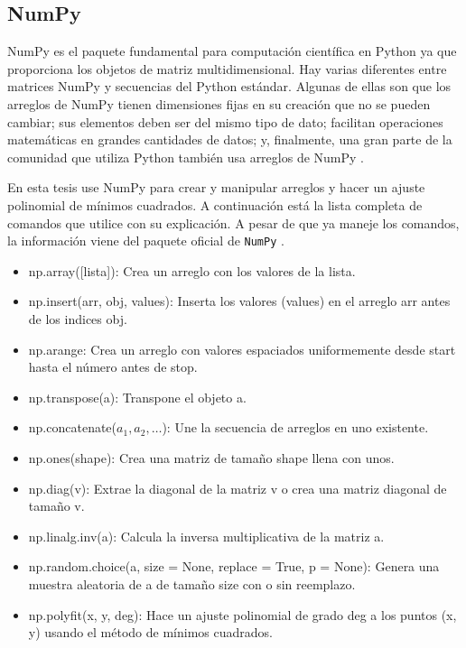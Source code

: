\subsection{NumPy}
NumPy es el paquete fundamental para computación científica en Python ya que proporciona los objetos de matriz multidimensional.
Hay varias diferentes entre matrices NumPy y secuencias del Python estándar. Algunas de ellas son que los arreglos de NumPy tienen dimensiones fijas en su creación que no se pueden cambiar; sus elementos deben ser del mismo tipo de dato; facilitan operaciones matemáticas en grandes cantidades de datos; y, finalmente, una gran parte de la comunidad que utiliza Python también usa arreglos de NumPy \citep{numpy_manual}. 

En esta tesis use NumPy para crear y manipular arreglos y hacer un ajuste polinomial de mínimos cuadrados. A continuación está la lista completa de comandos que utilice con su explicación. A pesar de que ya maneje los comandos, la información viene del paquete oficial de \texttt{NumPy} \cite{numpy_manual}. 

\begin{itemize}
	\item np.array([lista]): Crea un arreglo con los valores de la lista.
	
	\item np.insert(arr, obj, values): Inserta los valores (values) en el arreglo arr antes de los indices obj.
	
	\item np.arange: Crea un arreglo con valores espaciados uniformemente desde start hasta el número antes de stop. 
	
	\item np.transpose(a): Transpone el objeto a.
	
	\item np.concatenate($a_1, a_2, \dots $): Une la secuencia de arreglos en uno existente.
	
	\item np.ones(shape): Crea una matriz de tamaño shape llena con unos.
	
	\item np.diag(v): Extrae la diagonal de la matriz v o crea una matriz diagonal de tamaño v.
	
	\item np.linalg.inv(a): Calcula la inversa multiplicativa de la matriz a. 
	
	\item np.random.choice(a, size = None, replace = True, p = None): Genera una muestra aleatoria de a de tamaño size con o sin reemplazo. 
	
	\item np.polyfit(x, y, deg): Hace un ajuste polinomial de grado deg a los puntos (x, y) usando el método de mínimos cuadrados. 
	
\end{itemize}


